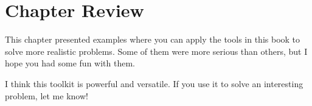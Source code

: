 \section{Chapter Review}

This chapter presented examples where you can apply the tools in this book to solve more realistic problems.  Some of them were more serious than others, but I hope you had some fun with them.

I think this toolkit is powerful and versatile.  If you use it to solve an interesting problem, let me know!

